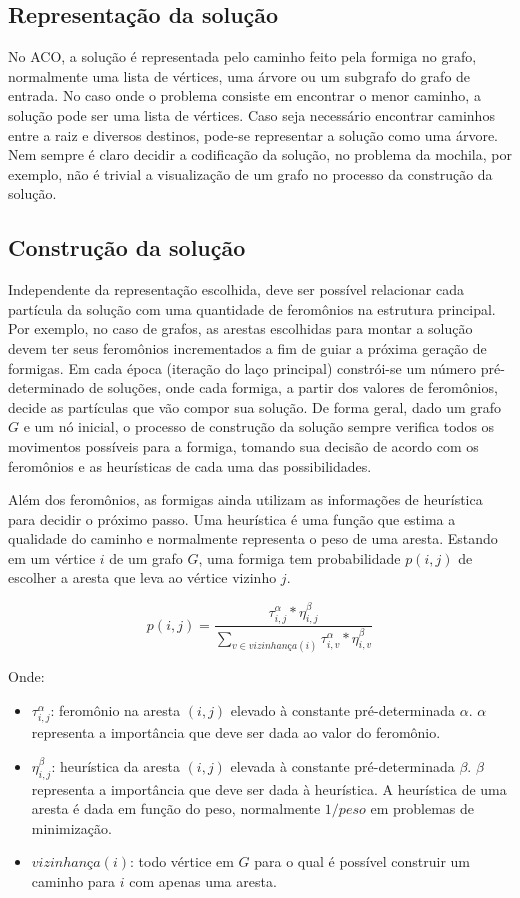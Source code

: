 \subsection{Representação da solução}
No ACO, a solução é representada pelo caminho feito pela formiga no grafo, normalmente uma lista de vértices, uma árvore ou um subgrafo do grafo de entrada. No caso onde o problema consiste em encontrar o menor caminho, a solução pode ser uma lista de vértices. Caso seja necessário encontrar caminhos entre a raiz e diversos destinos, pode-se representar a solução como uma árvore. Nem sempre é claro decidir a codificação da solução, no problema da mochila, por exemplo, não é trivial a visualização de um grafo no processo da construção da solução.

\subsection{Construção da solução}
Independente da representação escolhida, deve ser possível relacionar cada partícula da solução com uma quantidade de feromônios na estrutura principal. Por exemplo, no caso de grafos, as arestas escolhidas para montar a solução devem ter seus feromônios incrementados a fim de guiar a próxima geração de formigas. Em cada época (iteração do laço principal) constrói-se um número pré-determinado de soluções, onde cada formiga, a partir dos valores de feromônios, decide as partículas que vão compor sua solução. De forma geral, dado um grafo $G$ e um nó inicial, o processo de construção da solução sempre verifica todos os movimentos possíveis para a formiga, tomando sua decisão de acordo com os feromônios e as heurísticas de cada uma das possibilidades. 

Além dos feromônios, as formigas ainda utilizam as informações de heurística para decidir o próximo passo. Uma heurística é uma função que estima a qualidade do caminho e normalmente representa o peso de uma aresta. Estando em um vértice $i$ de um grafo $G$, uma formiga tem probabilidade $p(i,j)$ de escolher a aresta que leva ao vértice vizinho $j$.

\[ p(i,j) = \frac{\tau_{i,j}^\alpha * \eta_{i,j}^\beta}{\sum_{v \in vizinhança(i)} \tau_{i,v}^\alpha * \eta_{i,v}^\beta} \]

Onde:

\begin{itemize}  
	\item $\tau_{i,j}^\alpha$: feromônio na aresta $(i,j)$ elevado à constante pré-determinada $\alpha$. $\alpha$ representa a importância que deve ser dada ao valor do feromônio.
	\item $\eta_{i,j}^\beta$: heurística da aresta $(i,j)$ elevada à constante pré-determinada $\beta$. $\beta$ representa a importância que deve ser dada à heurística. A heurística de uma aresta é dada em função do peso, normalmente $1/peso$ em problemas de minimização.
	\item $vizinhança(i)$: todo vértice em $G$ para o qual é possível construir um caminho para $i$ com apenas uma aresta.
\end{itemize}

